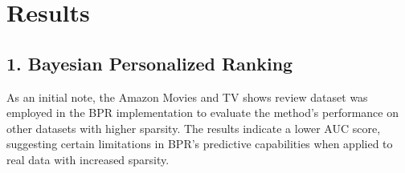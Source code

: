 \documentclass[journal]{IEEEtran}
\begin{document}
\section{Results}

\subsection*{1. Bayesian Personalized Ranking}

As an initial note, the Amazon Movies and TV shows review dataset was employed in the BPR implementation to evaluate the method's 
performance on other datasets with higher sparsity. The results indicate a lower AUC score, suggesting certain limitations in BPR's 
predictive capabilities when applied to real data with increased sparsity.

\begin{table}[htb]
\end{table}
\end{document}
